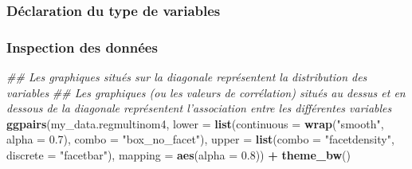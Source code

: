 \documentclass[
]{book}
\newenvironment{Shaded}{\begin{snugshade}}{\end{snugshade}}
\newcommand{\CommentTok}[1]{\textcolor[rgb]{0.56,0.35,0.01}{\textit{#1}}}
\newcommand{\DataTypeTok}[1]{\textcolor[rgb]{0.13,0.29,0.53}{#1}}
\newcommand{\FloatTok}[1]{\textcolor[rgb]{0.00,0.00,0.81}{#1}}
\newcommand{\KeywordTok}[1]{\textcolor[rgb]{0.13,0.29,0.53}{\textbf{#1}}}
\newcommand{\NormalTok}[1]{#1}
\newcommand{\OperatorTok}[1]{\textcolor[rgb]{0.81,0.36,0.00}{\textbf{#1}}}
\newcommand{\StringTok}[1]{\textcolor[rgb]{0.31,0.60,0.02}{#1}}
\begin{document}
\hypertarget{duxe9claration-du-type-de-variables-15}{%
\subsubsection{Déclaration du type de variables}\label{duxe9claration-du-type-de-variables-15}}

\begin{Shaded}
\end{Shaded}

\hypertarget{inspection-des-donnuxe9es-15}{%
\subsubsection{Inspection des données}\label{inspection-des-donnuxe9es-15}}

\begin{Shaded}
\begin{Highlighting}[]
\CommentTok{## Les graphiques situés sur la diagonale représentent la distribution des variables}
\CommentTok{## Les graphiques (ou les valeurs de corrélation) situés au dessus et en dessous de la diagonale représentent l'association entre les différentes variables}
\KeywordTok{ggpairs}\NormalTok{(my_data.regmultinom4,}
        \DataTypeTok{lower =} \KeywordTok{list}\NormalTok{(}\DataTypeTok{continuous =} \KeywordTok{wrap}\NormalTok{(}\StringTok{"smooth"}\NormalTok{, }\DataTypeTok{alpha =} \FloatTok{0.7}\NormalTok{), }\DataTypeTok{combo =} \StringTok{"box_no_facet"}\NormalTok{),}
        \DataTypeTok{upper =} \KeywordTok{list}\NormalTok{(}\DataTypeTok{combo =} \StringTok{"facetdensity"}\NormalTok{, }\DataTypeTok{discrete =} \StringTok{"facetbar"}\NormalTok{), }
        \DataTypeTok{mapping =} \KeywordTok{aes}\NormalTok{(}\DataTypeTok{alpha =} \FloatTok{0.8}\NormalTok{)) }\OperatorTok{+}\StringTok{ }\KeywordTok{theme_bw}\NormalTok{()}
\end{Highlighting}
\end{Shaded}
\end{document}
